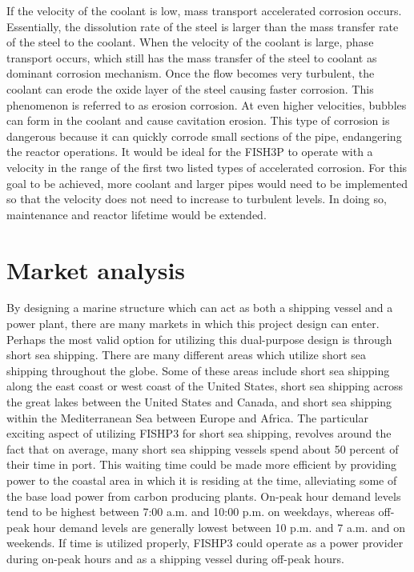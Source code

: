\documentclass[12pt]{article}
\begin{document}
If the velocity of the coolant is low, mass transport accelerated corrosion occurs.  Essentially, the dissolution rate of the steel is larger than the mass transfer rate of the steel to the coolant.  When the velocity of the coolant is large, phase transport occurs, which still has the mass transfer of the steel to coolant as dominant corrosion mechanism.  Once the flow becomes very turbulent, the coolant can erode the oxide layer of the steel causing faster corrosion.  This phenomenon is referred to as erosion corrosion.  At even higher velocities, bubbles can form in the coolant and cause cavitation erosion.  This type of corrosion is dangerous because it can quickly corrode small sections of the pipe, endangering the reactor operations.  It would be ideal for the FISH3P to operate with a velocity in the range of the first two listed types of accelerated corrosion.  For this goal to be achieved, more coolant and larger pipes would need to be implemented so that the velocity does not need to increase to turbulent levels.  In doing so, maintenance and reactor lifetime would be extended.




\section{Market analysis}

By designing a marine structure which can act as both a shipping vessel and a power plant, there are many markets in which this project design can enter. Perhaps the most valid option for utilizing this dual-purpose design is through short sea shipping. There are many different areas which utilize short sea shipping throughout the globe. Some of these areas include short sea shipping along the east coast or west coast of the United States, short sea shipping across the great lakes between the United States and Canada, and short sea shipping within the Mediterranean Sea between Europe and Africa. The particular exciting aspect of utilizing FISHP3 for short sea shipping, revolves around the fact that on average, many short sea shipping vessels spend about 50 percent of their time in port. This waiting time could be made more efficient by providing power to the coastal area in which it is residing at the time, alleviating some of the base load power from carbon producing plants. On-peak hour demand levels tend to be highest between 7:00 a.m. and 10:00 p.m. on weekdays, whereas off-peak hour demand levels are generally lowest between 10 p.m. and 7 a.m. and on weekends. If time is utilized properly, FISHP3 could operate as a power provider during on-peak hours and as a shipping vessel during off-peak hours.
\end{document}
